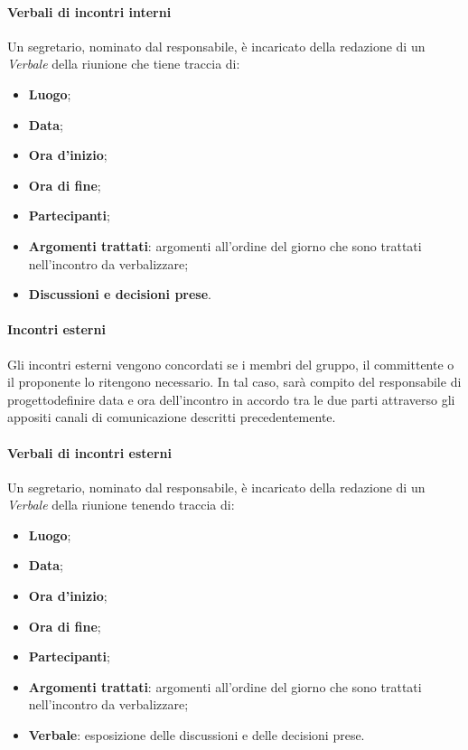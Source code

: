 			\paragraph*{Verbali di incontri interni}
				Un segretario, nominato dal responsabile, è incaricato della redazione di un \textit{Verbale} della riunione che tiene traccia di:
				\begin{itemize}
					\item \textbf{Luogo};
					\item \textbf{Data};
					\item \textbf{Ora d'inizio};
					\item \textbf{Ora di fine};
					\item \textbf{Partecipanti};
					\item \textbf{Argomenti trattati}: argomenti all'ordine del giorno che sono trattati nell'incontro da verbalizzare;
					\item \textbf{Discussioni e decisioni prese}.
				\end{itemize}
			\paragraph*{Incontri esterni}
				Gli incontri esterni vengono concordati se i membri del gruppo, il committente o il proponente lo ritengono necessario. In tal caso, sarà compito del responsabile di progetto\glosp definire data e ora dell'incontro in accordo tra le due parti attraverso gli appositi canali di comunicazione descritti precedentemente.
			\paragraph*{Verbali di incontri esterni}
				Un segretario, nominato dal responsabile, è incaricato della redazione di un \textit{Verbale} della riunione tenendo traccia di:
				\begin{itemize}
					\item \textbf{Luogo};
					\item \textbf{Data};
					\item \textbf{Ora d'inizio};
					\item \textbf{Ora di fine};
					\item \textbf{Partecipanti};
					\item \textbf{Argomenti trattati}: argomenti all'ordine del giorno che sono trattati nell'incontro da verbalizzare;
					\item \textbf{Verbale}: esposizione delle discussioni e delle decisioni prese.
				\end{itemize}
